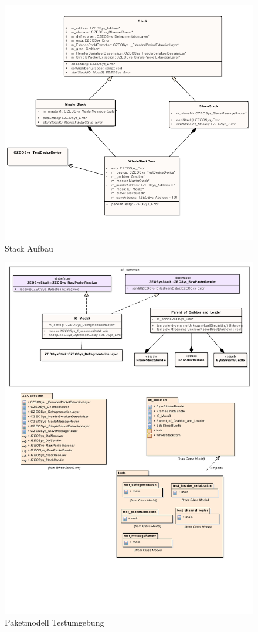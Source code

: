 \documentclass[12pt,a4paper]{scrreprt}
\begin{document}
\begin{figure}[htbp] 
  \centering
     \includegraphics[width=1.0\textwidth]{stack.png}
  \caption{Stack Aufbau}
  \label{fig:Bild3}
\end{figure}


\begin{figure}[htbp] 
  \centering
     \includegraphics[width=1.0\textwidth]{afl_common.pdf}
  \caption{Paketmodell Testumgebung}
  \label{fig:Bild4}
\end{figure}
\end{document}
